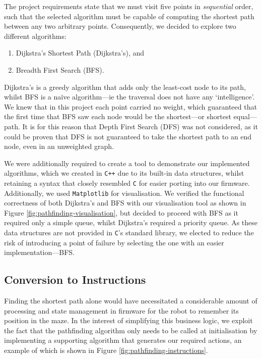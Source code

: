 \documentclass[conference]{IEEEtran}
\begin{document}
The project requirements state that we must visit five points in \emph{sequential} order, such that the selected algorithm must be capable of computing the shortest path between any two arbitrary points.
Consequently, we decided to explore two different algorithms:
\begin{enumerate}
	\item Dijkstra's Shortest Path (Dijkstra's), and
	\item Breadth First Search (BFS).
\end{enumerate}
Dijkstra's is a greedy algorithm that adds only the least-cost node to its path, whilst BFS is a naïve algorithm—ie the traversal does not have any `intelligence'.
We knew that in this project each point carried no weight, which guaranteed that the first time that BFS saw each node would be the shortest—or shortest equal—path.
It is for this reason that Depth First Search (DFS) was not considered, as it could be proven that DFS is not guaranteed to take the shortest path to an end node, even in an unweighted graph.

We were additionally required to create a tool to demonstrate our implemented algorithms, which we created in \texttt{C++} due to its built-in data structures, whilst retaining a syntax that closely resembled \texttt{C} for easier porting into our firmware.
Additionally, we used \texttt{Matplotlib} for visualisation.
We verified the functional correctness of both Dijkstra's and BFS with our visualisation tool as shown in Figure \ref{fig:pathfinding-visualisation}, but decided to proceed with BFS as it required only a simple queue, whilst Dijkstra's required a priority queue.
As these data structures are not provided in \texttt{C}'s standard library, we elected to reduce the risk of introducing a point of failure by selecting the one with an easier implementation—BFS.

\subsection{Conversion to Instructions}

Finding the shortest path alone would have necessitated a considerable amount of processing and state management in firmware for the robot to remember its position in the maze.
In the interest of simplifying this business logic, we exploit the fact that the pathfinding algorithm only needs to be called at initialisation by implementing a supporting algorithm that generates our required actions, an example of which is shown in Figure \ref{fig:pathfinding-instructions}.
\end{document}
